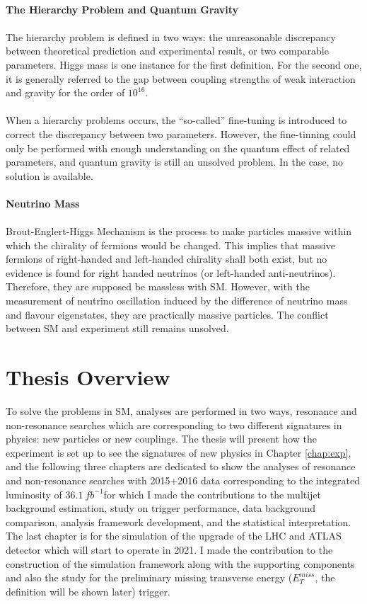 \\{\bf The Hierarchy Problem and Quantum Gravity\cite{BenA}}
\\
\\The hierarchy problem is defined in two ways: the unreasonable discrepancy between theoretical prediction and experimental result, or two comparable parameters. Higgs mass is one instance for the first definition. For the second one, it is generally referred to the gap between coupling strengths of weak interaction and gravity for the order of $10^{16}$.
\\
\\When a hierarchy problems occurs, the ``so-called'' fine-tuning is introduced to correct the discrepancy between two parameters. However, the fine-tinning could only be performed with enough understanding on the quantum effect of related parameters, and quantum gravity is still an unsolved problem. In the case, no solution is available.
\\
\\{\bf Neutrino Mass}
\\
\\Brout-Englert-Higgs Mechanism is the process to make particles massive within which the chirality of fermions would be changed. This implies that massive fermions of right-handed and left-handed chirality shall both exist, but no evidence is found for right handed neutrinos (or left-handed anti-neutrinos). Therefore, they are supposed be massless with SM. However, with the measurement of neutrino oscillation\cite{SuperK} induced by the difference of neutrino mass and flavour eigenstates, they are practically massive particles. The conflict between SM and experiment still remains unsolved.
\section{Thesis Overview}
To solve the problems in SM, analyses are performed in two ways, resonance and non-resonance searches which are corresponding to two different signatures in physics: new particles or new couplings. The thesis will present how the experiment is set up to see the signatures of new physics in Chapter \ref{chap:exp}, and the following three chapters are dedicated to show the analyses of resonance and non-resonance searches with 2015+2016 data corresponding to the integrated luminosity of $36.1~fb^{-1}$for which I made the contributions to the multijet background estimation, study on trigger performance, data background comparison, analysis framework development, and the statistical interpretation. The last chapter is for the simulation of the upgrade of the LHC and ATLAS detector which will start to operate in 2021. I made the contribution to the construction of the simulation framework along with the supporting components and also the study for the preliminary missing transverse energy ($E^{miss}_{T}$, the definition will be shown later) trigger.

